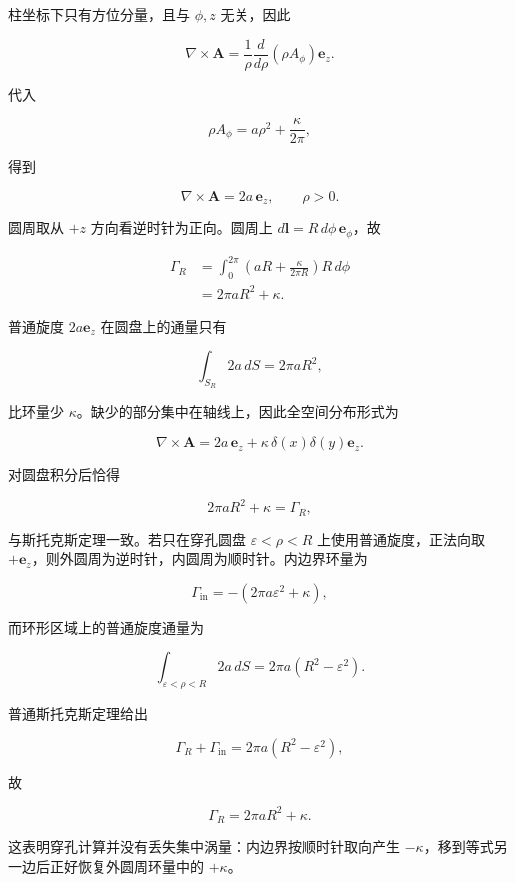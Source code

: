 柱坐标下只有方位分量，且与 \(\phi,z\) 无关，因此

\[
\nabla\times\mathbf A
=
\frac1\rho
\frac{d}{d\rho}
\left(
\rho A_{\phi}
\right)\mathbf e_z.
\]

代入

\[
\rho A_{\phi}
=a\rho^2+\frac{\kappa}{2\pi},
\]

得到

\[
\boxed{
\nabla\times\mathbf A
=2a\,\mathbf e_z
},
\qquad \rho>0.
\]

圆周取从 \(+z\) 方向看逆时针为正向。圆周上
\(d\mathbf l=R\,d\phi\,\mathbf e_{\phi}\)，故

\[
\begin{aligned}
\Gamma_R
&=\int_0^{2\pi}
\left(
aR+\frac{\kappa}{2\pi R}
\right)R\,d\phi\\
&=2\pi aR^2+\kappa.
\end{aligned}
\]

普通旋度 \(2a\mathbf e_z\) 在圆盘上的通量只有

\[
\int_{S_R}2a\,dS=2\pi aR^2,
\]

比环量少 \(\kappa\)。缺少的部分集中在轴线上，因此全空间分布形式为

\[
\boxed{
\nabla\times\mathbf A
=
2a\,\mathbf e_z
+
\kappa\,\delta(x)\delta(y)\mathbf e_z
}.
\]

对圆盘积分后恰得

\[
2\pi aR^2+\kappa=\Gamma_R,
\]

与斯托克斯定理一致。若只在穿孔圆盘 \(\varepsilon<\rho<R\)
上使用普通旋度，正法向取
\(+\mathbf e_z\)，则外圆周为逆时针，内圆周为顺时针。内边界环量为

\[
\Gamma_{\mathrm{in}}
=-\left(2\pi a\varepsilon^2+\kappa\right),
\]

而环形区域上的普通旋度通量为

\[
\int_{\varepsilon<\rho<R}2a\,dS
=2\pi a\left(R^2-\varepsilon^2\right).
\]

普通斯托克斯定理给出

\[
\Gamma_R+\Gamma_{\mathrm{in}}
=2\pi a\left(R^2-\varepsilon^2\right),
\]

故

\[
\Gamma_R=2\pi aR^2+\kappa.
\]

这表明穿孔计算并没有丢失集中涡量：内边界按顺时针取向产生
\(-\kappa\)，移到等式另一边后正好恢复外圆周环量中的 \(+\kappa\)。

